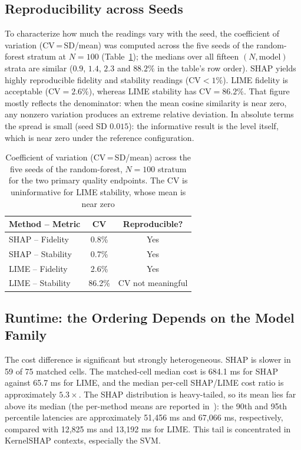 \documentclass[11pt,a4paper]{article}
\begin{document}
\subsection{Reproducibility across Seeds}

To characterize how much the readings vary with the seed, the coefficient
of variation (CV\,=\,SD/mean) was computed across the five seeds of the
random-forest stratum at $N=100$ (Table~\ref{tab:cv_reproducibility}); the
medians over all fifteen $(N, \mathrm{model})$ strata are similar ($0.9$,
$1.4$, $2.3$ and $88.2\%$ in the table's row order). SHAP yields highly
reproducible fidelity and stability readings ($\mathrm{CV}<1\%$). LIME
fidelity is acceptable ($\mathrm{CV}=2.6\%$), whereas LIME stability has
$\mathrm{CV}=86.2\%$. That figure mostly reflects the denominator: when the
mean cosine similarity is near zero, any nonzero variation produces an
extreme relative deviation. In absolute terms the spread is small (seed SD
$0.015$): the informative result is the level itself, which is near zero
under the reference configuration.

\begin{table}[htb]
\centering
\caption{Coefficient of variation (CV\,=\,SD/mean) across the five seeds of
the random-forest, $N=100$ stratum for the two primary quality endpoints.
The CV is uninformative for LIME stability, whose mean is near zero}
\label{tab:cv_reproducibility}
\begin{tabular}{lcc}
\toprule
Method -- Metric    & CV & Reproducible? \\
\midrule
SHAP -- Fidelity    & 0.8\%     & Yes \\
SHAP -- Stability   & 0.7\%     & Yes \\
LIME -- Fidelity    & 2.6\%     & Yes \\
LIME -- Stability   & 86.2\%    & CV not meaningful \\
\bottomrule
\end{tabular}
\end{table}

\subsection{Runtime: the Ordering Depends on the Model Family}
\label{sec:runtime}

The cost difference is significant but strongly heterogeneous. SHAP is
slower in 59 of 75 matched cells. The matched-cell median cost is 684.1 ms
for SHAP against 65.7 ms for LIME, and the median per-cell SHAP/LIME cost
ratio is approximately $5.3\times$. The SHAP distribution is heavy-tailed,
so its mean lies far above its median (the per-method means are reported
in~\cite{herrera2026framework}): the 90th and 95th percentile latencies are
approximately 51,456 ms and 67,066 ms, respectively, compared with
12,825 ms and 13,192 ms for LIME. This tail is concentrated in KernelSHAP
contexts, especially the SVM.
\end{document}
